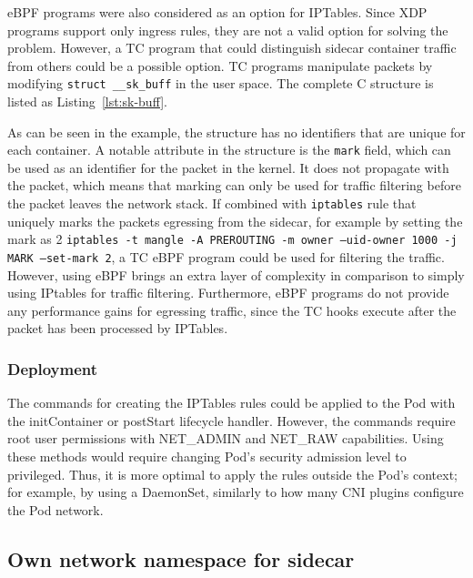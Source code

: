 \documentclass[english, 12pt, a4paper, sci, utf8, a-2b, online]{aaltothesis}
\begin{document}
eBPF programs were also considered as an option for IPTables.
Since XDP programs support only ingress rules, they are not a valid option for solving the problem.
However, a TC program that could distinguish sidecar container traffic from others could be a possible option.
TC programs manipulate packets by modifying \texttt{struct \_\_sk\_buff} in the user space.
The complete C structure is listed as Listing~\ref{lst:sk-buff}.



As can be seen in the example, the structure has no identifiers that are unique for each container.
A notable attribute in the structure is the \texttt{mark} field, which can be used as an identifier for the packet in the kernel.
It does not propagate with the packet, which means that marking can only be used for traffic filtering before the packet leaves the network stack.
If combined with \texttt{iptables} rule that uniquely marks the packets egressing from the sidecar, for example by setting the mark as 2 \texttt{iptables -t mangle -A PREROUTING -m owner --uid-owner 1000 -j MARK --set-mark 2}, a TC eBPF program could be used for filtering the traffic.
However, using eBPF brings an extra layer of complexity in comparison to simply using IPtables for traffic filtering.
Furthermore, eBPF programs do not provide any performance gains for egressing traffic, since the TC hooks execute after the packet has been processed by IPTables.

\subsubsection{Deployment}

The commands for creating the IPTables rules could be applied to the Pod with the initContainer or postStart lifecycle handler.
However, the commands require root user permissions with NET\_ADMIN and NET\_RAW capabilities.
Using these methods would require changing Pod's security admission level to privileged.
Thus, it is more optimal to apply the rules outside the Pod's context; for example, by using a DaemonSet, similarly to how many CNI plugins configure the Pod network.

\subsection{Own network namespace for sidecar}
\end{document}
